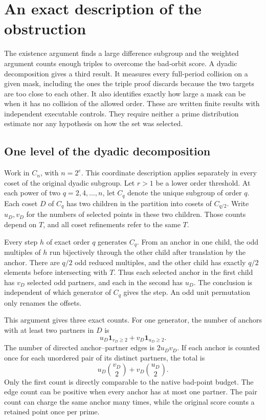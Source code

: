 \documentclass[12pt,letterpaper]{article}
\begin{document}
\section{An exact description of the obstruction}
\label{sec:tree}

The existence argument finds a large difference subgroup and the weighted argument counts enough triples to overcome the bad-orbit score. A dyadic decomposition gives a third result. It measures every full-period collision on a given mask, including the ones the triple proof discards because the two targets are too close to each other. It also identifies exactly how large a mask can be when it has no collision of the allowed order. These are written finite results with independent executable controls. They require neither a prime distribution estimate nor any hypothesis on how the set was selected.

\subsection{One level of the dyadic decomposition}

Work in \(C_n\), with \(n=2^e\). This coordinate description applies separately in every coset of the original dyadic subgroup. Let \(r>1\) be a lower order threshold. At each power of two \(q=2,4,\ldots,n\), let \(C_q\) denote the unique subgroup of order \(q\). Each coset \(D\) of \(C_q\) has two children in the partition into cosets of \(C_{q/2}\). Write \(u_D,v_D\) for the numbers of selected points in these two children. Those counts depend on \(T\), and all coset refinements refer to the same \(T\).

Every step \(h\) of exact order \(q\) generates \(C_q\). From an anchor in one child, the odd multiples of \(h\) run bijectively through the other child after translation by the anchor. There are \(q/2\) odd reduced multiples, and the other child has exactly \(q/2\) elements before intersecting with \(T\). Thus each selected anchor in the first child has \(v_D\) selected odd partners, and each in the second has \(u_D\). The conclusion is independent of which generator of \(C_q\) gives the step. An odd unit permutation only renames the offsets.

This argument gives three exact counts. For one generator, the number of anchors with at least two partners in \(D\) is
\[
               u_D\mathbf{1}_{v_D\ge 2}+v_D\mathbf{1}_{u_D\ge 2}.
\]
The number of directed anchor--partner edges is \(2u_Dv_D\). If each anchor is counted once for each unordered pair of its distinct partners, the total is
\[
              u_D\binom{v_D}{2}+v_D\binom{u_D}{2}.
\]
Only the first count is directly comparable to the native bad-point budget. The edge count can be positive when every anchor has at most one partner. The pair count can charge the same anchor many times, while the original score counts a retained point once per prime.
\end{document}
